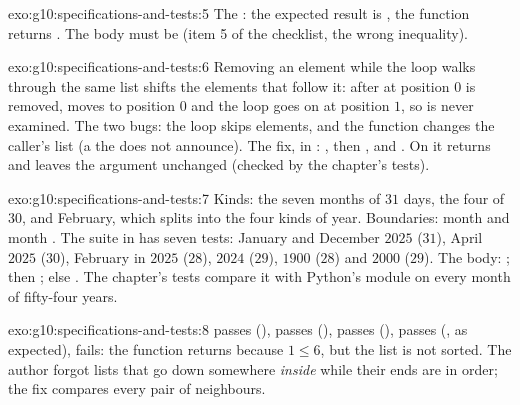 \begin{solution}{exo:g10:specifications-and-tests:5}
The  : the expected result is , the function returns . The
body must be  (item 5 of the checklist, the wrong inequality).
\end{solution}

\begin{solution}{exo:g10:specifications-and-tests:6}
Removing an element while the loop walks through the same list shifts the elements that follow it: after
 at position $0$ is removed,  moves to position $0$ and the loop goes on at position $1$, so
 is never examined. The two bugs: the loop skips elements, and the function changes the caller's list (a
 the  does not announce). The fix, in :
, then  , and . On
\code{[-1, -2, 3]} it returns \code{[3]} and leaves the argument unchanged (checked by the chapter's tests).
\end{solution}

\begin{solution}{exo:g10:specifications-and-tests:7}
Kinds: the seven months of $31$ days, the four of $30$, and February, which splits into the four kinds of year.
Boundaries: month  and month . The suite in  has seven tests:
January and December $2025$ ($31$), April $2025$ ($30$), February in $2025$ ($28$), $2024$ ($29$), $1900$ ($28$) and
$2000$ ($29$). The body: ; then
; else . The chapter's tests compare it with Python's
 module on every month of fifty-four years.
\end{solution}

\begin{solution}{exo:g10:specifications-and-tests:8}
\code{[]} passes (), \code{[4]} passes (), \code{[1, 2, 3]} passes (),
\code{[3, 2, 1]} passes (, as expected), \code{[1, 5, 2, 6]} fails: the function returns 
because $1 \le 6$, but the list is not sorted. The author forgot lists that go down somewhere \emph{inside} while
their ends are in order; the fix compares every pair of neighbours.
\end{solution}

